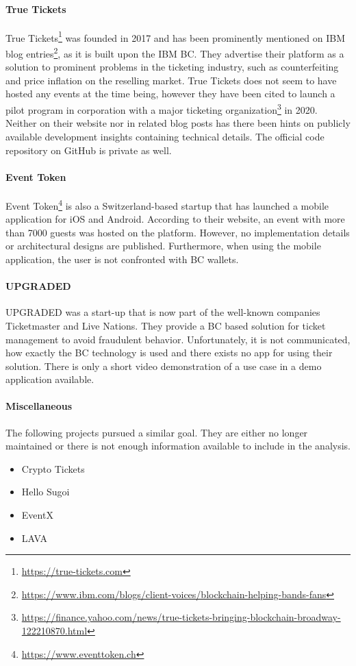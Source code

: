 \paragraph{True Tickets}
True Tickets\footnote{\href{https://true-tickets.com/}{https://true-tickets.com}} was founded in 2017 and has been prominently mentioned on IBM blog entries\footnote{\href{https://www.ibm.com/blogs/client-voices/blockchain-helping-bands-fans/}{https://www.ibm.com/blogs/client-voices/blockchain-helping-bands-fans}}, as it is built upon the IBM BC. They advertise their platform as a solution to prominent problems in the ticketing industry, such as counterfeiting and price inflation on the reselling market. True Tickets does not seem to have hosted any events at the time being, however they have been cited to launch a pilot program in corporation with a major ticketing organization\footnote{\href{https://finance.yahoo.com/news/true-tickets-bringing-blockchain-broadway-122210870.html}{https://finance.yahoo.com/news/true-tickets-bringing-blockchain-broadway-122210870.html}} in 2020.
Neither on their website nor in related blog posts has there been hints on publicly available development insights containing technical details. The official code repository on GitHub is private as well.

\paragraph{Event Token}
Event Token\footnote{\href{https://www.eventtoken.ch/}{https://www.eventtoken.ch}} is also a Switzerland-based startup that has launched a mobile application for iOS and Android. According to their website, an event with more than 7000 guests was hosted on the platform. However, no implementation details or architectural designs are published. Furthermore, when using the mobile application, the user is not confronted with BC wallets. 

\paragraph{UPGRADED} UPGRADED \cite{UPGRADED} was a start-up that is now part of the well-known companies Ticketmaster and Live Nations. They provide a BC based solution for ticket management to avoid fraudulent behavior. Unfortunately, it is not communicated, how exactly the BC technology is used and there exists no app for using their solution. There is only a short video demonstration of a use case in a demo application available.

\paragraph{Miscellaneous}
The following projects pursued a similar goal. They are either no longer maintained or there is not enough information available to include in the analysis.

\begin{itemize}
    \item Crypto Tickets
    \item Hello Sugoi
    \item EventX
    \item LAVA
\end{itemize}
